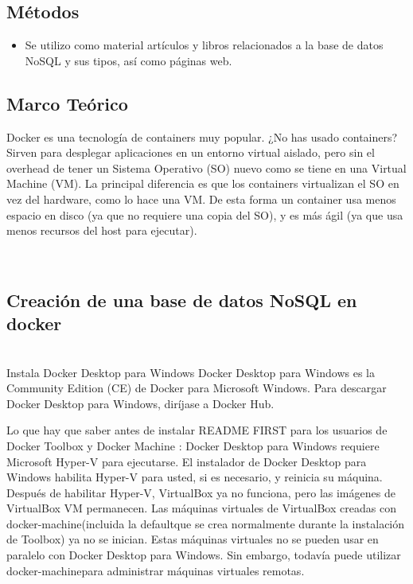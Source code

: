 \documentclass[twoside,onecolumn]{article}
\begin{document}
\subsection{Métodos}
	\begin{itemize}
		\item Se utilizo como material artículos y libros relacionados a la base de datos NoSQL y sus tipos, así como páginas web.
	\end{itemize}
\begin{flushright}
\begin{itemize}

\section{Marco Teórico}

Docker es una tecnología de containers muy popular.
¿No has usado containers? Sirven para desplegar aplicaciones en un entorno virtual aislado, pero sin el overhead de tener un Sistema Operativo (SO) nuevo como se tiene en una Virtual Machine (VM).
La principal diferencia es que los containers virtualizan el SO en vez del hardware, como lo hace una VM. De esta forma un container usa menos espacio en disco (ya que no requiere una copia del SO), y es más ágil (ya que usa menos recursos del host para ejecutar).

\textbf{}\\
\subsection{Creación de una base de datos NoSQL en docker}
\textbf{}\\
Instala Docker Desktop para Windows
Docker Desktop para Windows es la Community Edition (CE) de Docker para Microsoft Windows. Para descargar Docker Desktop para Windows, diríjase a Docker Hub.

Lo que hay que saber antes de instalar
README FIRST para los usuarios de Docker Toolbox y Docker Machine : Docker Desktop para Windows requiere Microsoft Hyper-V para ejecutarse. El instalador de Docker Desktop para Windows habilita Hyper-V para usted, si es necesario, y reinicia su máquina. Después de habilitar Hyper-V, VirtualBox ya no funciona, pero las imágenes de VirtualBox VM permanecen. Las máquinas virtuales de VirtualBox creadas con docker-machine(incluida la defaultque se crea normalmente durante la instalación de Toolbox) ya no se inician. Estas máquinas virtuales no se pueden usar en paralelo con Docker Desktop para Windows. Sin embargo, todavía puede utilizar docker-machinepara administrar máquinas virtuales remotas.


\end{itemize}
\end{flushright}
\end{document}
